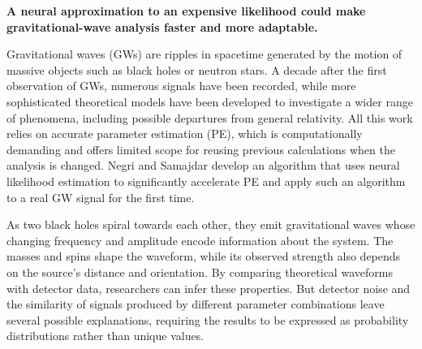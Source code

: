 \documentclass[11pt,a4paper]{article}
\begin{document}
\vspace{8pt}
\noindent\textbf{A neural approximation to an expensive likelihood could make
  gravitational-wave analysis faster and more adaptable.}
\vspace{8pt}


Gravitational waves (GWs) are ripples in spacetime generated by the motion of massive objects such as black holes or neutron stars. A decade after the first observation of GWs, numerous signals have been recorded, while more sophisticated theoretical models have been developed to investigate a wider range of phenomena, including possible departures from general relativity. All this work relies on accurate parameter estimation (PE), which is computationally demanding and offers limited scope for reusing previous calculations when the analysis is changed. Negri and Samajdar\cite{negri2025} develop an algorithm that uses neural likelihood estimation to significantly accelerate PE and apply such an algorithm to a real GW signal for the first time.


As two black holes spiral towards each other, they emit gravitational waves whose changing frequency and amplitude encode information about the system. The masses and spins shape the waveform, while its observed strength also depends on the source’s distance and orientation. By comparing theoretical waveforms with detector data, researchers can infer these properties. But detector noise and the similarity of signals produced by different parameter combinations leave several possible explanations, requiring the results to be expressed as probability distributions rather than unique values.
\end{document}

